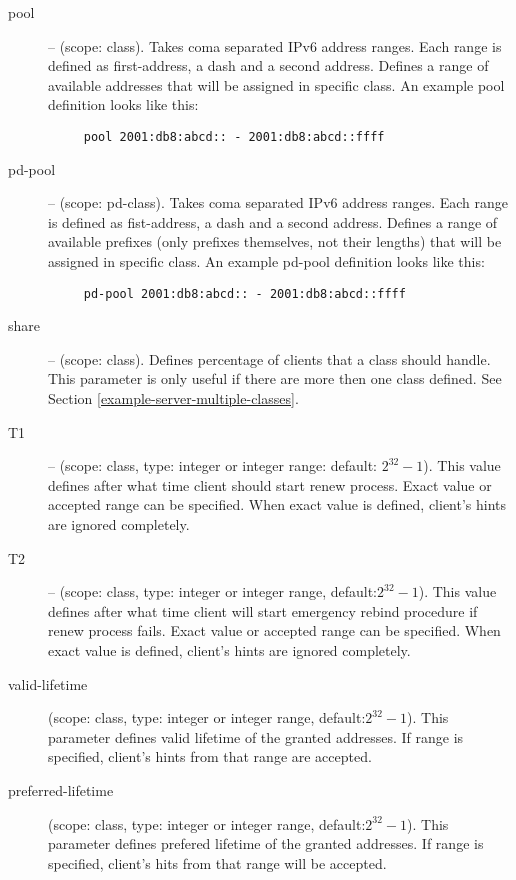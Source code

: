 \begin{description}
 \item[pool] -- (scope: class). Takes coma separated IPv6 address
   ranges. Each range is defined as first-address, a dash and a second
   address. Defines a range of available addresses that will be
   assigned in specific class. An example pool definition looks like
   this:
   \begin{lstlisting}
     pool 2001:db8:abcd:: - 2001:db8:abcd::ffff
   \end{lstlisting}

 \item[pd-pool] -- (scope: pd-class). Takes coma separated IPv6
   address ranges. Each range is defined as fist-address, a dash and a
   second address. Defines a range of available prefixes (only
   prefixes themselves, not their lengths) that will be assigned in
   specific class. An example pd-pool definition looks like this:
   \begin{lstlisting}
     pd-pool 2001:db8:abcd:: - 2001:db8:abcd::ffff
   \end{lstlisting}

\item[share] -- (scope: class). Defines percentage of clients that a
  class should handle. This parameter is only useful if there are more
  then one class defined. See Section
  \ref{example-server-multiple-classes}.

 \item[T1] -- (scope: class, type: integer or integer range: default:
   $2^{32}-1$). This value defines after what time client should start
   renew process. Exact value or accepted range can be specified. When
   exact value is defined, client's hints are ignored completely.

 \item[T2] -- (scope: class, type: integer or integer range,
   default:$2^{32}-1$). This value defines after what time client will
   start emergency rebind procedure if renew process fails. Exact
   value or accepted range can be specified. When exact value is
   defined, client's hints are ignored completely.

\item[valid-lifetime] (scope: class, type: integer or integer range,
            default:$2^{32}-1$). This parameter defines valid lifetime of
            the granted addresses. If range is specified, client's
            hints from that range are accepted.

\item[preferred-lifetime] (scope: class, type: integer or integer range,
            default:$2^{32}-1$). This parameter defines prefered
            lifetime of the granted addresses. If range is specified,
            client's hits from that range will be accepted.


\end{description}
